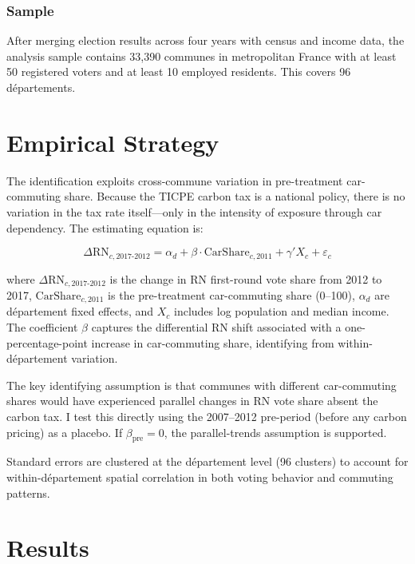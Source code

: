 \documentclass[12pt]{article}
\begin{document}
\subsubsection*{Sample} After merging election results across four years with census and income data, the analysis sample contains 33,390 communes in metropolitan France with at least 50 registered voters and at least 10 employed residents. This covers 96 d\'{e}partements.




\section{Empirical Strategy}
\label{sec:strategy}

The identification exploits cross-commune variation in pre-treatment car-commuting share. Because the TICPE carbon tax is a national policy, there is no variation in the tax rate itself---only in the intensity of exposure through car dependency. The estimating equation is:

\begin{equation}
\Delta \text{RN}_{c, 2017\text{-}2012} = \alpha_d + \beta \cdot \text{CarShare}_{c, 2011} + \gamma' X_c + \varepsilon_c
\label{eq:main}
\end{equation}

\noindent where $\Delta \text{RN}_{c, 2017\text{-}2012}$ is the change in RN first-round vote share from 2012 to 2017, $\text{CarShare}_{c, 2011}$ is the pre-treatment car-commuting share (0--100), $\alpha_d$ are d\'{e}partement fixed effects, and $X_c$ includes log population and median income. The coefficient $\beta$ captures the differential RN shift associated with a one-percentage-point increase in car-commuting share, identifying from within-d\'{e}partement variation.

The key identifying assumption is that communes with different car-commuting shares would have experienced parallel changes in RN vote share absent the carbon tax. I test this directly using the 2007--2012 pre-period (before any carbon pricing) as a placebo. If $\beta_{\text{pre}} = 0$, the parallel-trends assumption is supported.

Standard errors are clustered at the d\'{e}partement level (96 clusters) to account for within-d\'{e}partement spatial correlation in both voting behavior and commuting patterns.


\section{Results}
\label{sec:results}
\end{document}
